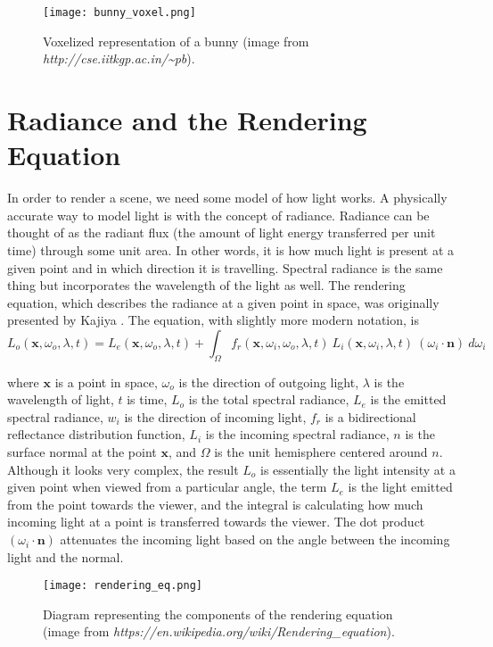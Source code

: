 \begin{figure}[h]
\centering
\texttt{[image: bunny\_voxel.png]}
\caption{Voxelized representation of a bunny (image from \textit{http://cse.iitkgp.ac.in/\textasciitilde pb}).}
\label{fig:bunnyvoxel}
\end{figure}

\section{Radiance and the Rendering Equation}
In order to render a scene, we need some model of how light works. A physically accurate way to model light is with the concept of radiance. Radiance can be thought of as the radiant flux (the amount of light energy transferred per unit time) through some unit area. In other words, it is how much light is present at a given point and in which direction it is travelling. Spectral radiance is the same thing but incorporates the wavelength of the light as well. The rendering equation, which describes the radiance at a given point in space, was originally presented by Kajiya \cite{kajiya1986rendering}. The equation, with slightly more modern notation, is
\begin{equation*}
    L_o(\bm{x}, \omega_o, \lambda, t) = L_e(\bm{x}, \omega_o, \lambda, t) + \int_\Omega f_r(\bm{x}, \omega_i, \omega_o, \lambda, t)\ L_i(\bm{x}, \omega_i, \lambda, t)\ (\omega_i \cdot \bm{n})\ d\omega_i
\end{equation*}

where $\bm{x}$ is a point in space, $\omega_o$ is the direction of outgoing light, $\lambda$ is the wavelength of light, $t$ is time, $L_o$ is the total spectral radiance, $L_e$ is the emitted spectral radiance, $w_i$ is the direction of incoming light, $f_r$ is a bidirectional reflectance distribution function, $L_i$ is the incoming spectral radiance, $n$ is the surface normal at the point $\bm{x}$, and $\Omega$ is the unit hemisphere centered around $n$. Although it looks very complex, the result $L_o$ is essentially the light intensity at a given point when viewed from a particular angle, the term $L_e$ is the light emitted from the point towards the viewer, and the integral is calculating how much incoming light at a point is transferred towards the viewer. The dot product $(\omega_i \cdot \bm{n})$ attenuates the incoming light based on the angle between the incoming light and the normal.

\begin{figure}[h]
\centering
\texttt{[image: rendering\_eq.png]}
\caption{Diagram representing the components of the rendering equation (image from \textit{https://en.wikipedia.org/wiki/Rendering\_equation}).}
\label{fig:renderingeq}
\end{figure}

